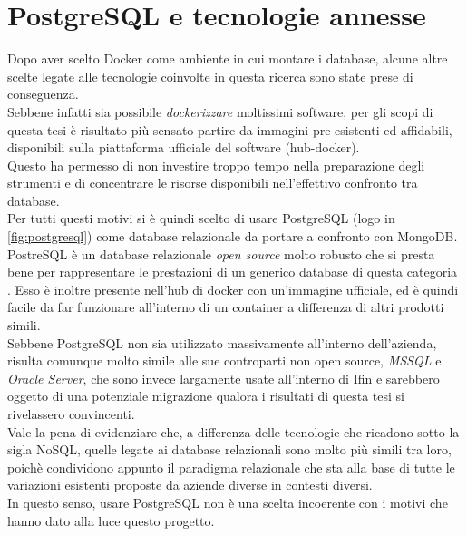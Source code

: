 \section{PostgreSQL e tecnologie annesse}
Dopo aver scelto Docker come ambiente in cui montare i database, alcune altre scelte legate alle tecnologie coinvolte in questa ricerca sono state prese di conseguenza.\\
Sebbene infatti sia possibile \textit{dockerizzare} moltissimi software, per gli scopi di questa tesi è risultato più sensato partire da immagini pre-esistenti ed affidabili, disponibili sulla piattaforma ufficiale del software (hub-docker).\\
Questo ha permesso di non investire troppo tempo nella preparazione degli strumenti e di concentrare le risorse disponibili nell'effettivo confronto tra database.\\

\noindent Per tutti questi motivi si è quindi scelto di usare PostgreSQL (logo in \autoref{fig:postgresql}) come database relazionale da portare a confronto con MongoDB.\\
PostreSQL è un database relazionale \textit{open source} molto robusto che si presta bene per rappresentare le prestazioni di un generico database di questa categoria \cite{site:postgres}. Esso è inoltre presente nell'hub di docker con un'immagine ufficiale, ed è quindi facile da far funzionare all'interno di un container a differenza di altri prodotti simili.\\
Sebbene PostgreSQL non sia utilizzato massivamente all'interno dell'azienda, risulta comunque molto simile alle sue controparti non open source, \textit{MSSQL} e \textit{Oracle Server}, che sono invece largamente usate all'interno di Ifin e sarebbero oggetto di una potenziale migrazione qualora i risultati di questa tesi si rivelassero convincenti.\\

\noindent Vale la pena di evidenziare che, a differenza delle tecnologie che ricadono sotto la sigla NoSQL, quelle legate ai database relazionali sono molto più simili tra loro, poichè condividono appunto il paradigma relazionale che sta alla base di tutte le variazioni esistenti proposte da aziende diverse in contesti diversi.\\
In questo senso, usare PostgreSQL non è una scelta incoerente con i motivi che hanno dato alla luce questo progetto.\\

